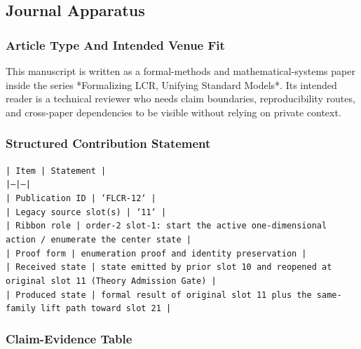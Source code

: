 \documentclass[11pt]{article}
\begin{document}
\subsection*{Journal Apparatus}

\subsubsection*{Article Type And Intended Venue Fit}

This manuscript is written as a formal-methods and mathematical-systems paper
inside the series *Formalizing LCR, Unifying Standard Models*. Its intended
reader is a technical reviewer who needs claim boundaries, reproducibility
routes, and cross-paper dependencies to be visible without relying on private
context.

\subsubsection*{Structured Contribution Statement}

\noindent\texttt{| Item | Statement |}\\
\noindent\texttt{|---|---|}\\
\noindent\texttt{| Publication ID | `FLCR-12` |}\\
\noindent\texttt{| Legacy source slot(s) | `11` |}\\
\noindent\texttt{| Ribbon role | order-2 slot-1: start the active one-dimensional action / enumerate the center state |}\\
\noindent\texttt{| Proof form | enumeration proof and identity preservation |}\\
\noindent\texttt{| Received state | state emitted by prior slot 10 and reopened at original slot 11 (Theory Admission Gate) |}\\
\noindent\texttt{| Produced state | formal result of original slot 11 plus the same-family lift path toward slot 21 |}\\

\subsubsection*{Claim-Evidence Table}
\end{document}

